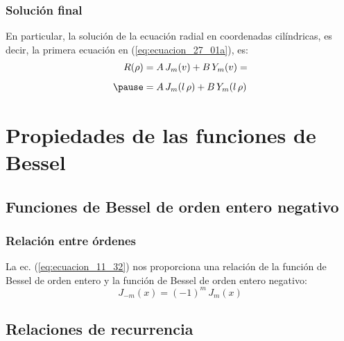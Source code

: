 \documentclass[12pt]{beamer}
\begin{document}
\begin{frame}
\frametitle{Solución final}
En particular, la solución de la ecuación radial en coordenadas cilíndricas, es decir, la primera ecuación en (\ref{eq:ecuacion_27_01a}), es:
\pause
\begin{eqnarray}
\begin{aligned}
R (\rho) &= A \, J_{m} (v) + B \, Y_{m} (v) = \\[0.5em] \pause 
&= A \, J_{m} (l \, \rho) + B \, Y_{m} (l \, \rho)
\end{aligned}
\label{eq:ecuacion_27_13}
\end{eqnarray}
\end{frame}

\section{Propiedades de las funciones de Bessel}
\subsection{Funciones de Bessel de orden entero negativo}

\begin{frame}
\frametitle{Relación entre órdenes}
La ec. (\ref{eq:ecuacion_11_32}) nos proporciona una relación de la función de Bessel de orden entero y la función de Bessel de orden entero negativo:
\pause
\begin{equation}
J_{-m} (x) = (-1)^{m} \, J_{m} (x)
\label{eq:ecuacion_27_14}
\end{equation}
\end{frame}

\subsection{Relaciones de recurrencia}
\end{document}
